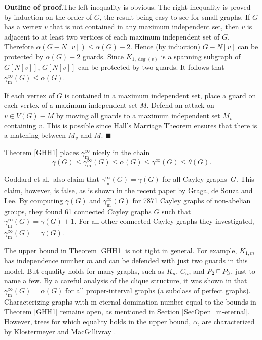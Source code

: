 \documentclass[12pt]{article}%
\providecommand{\boksie}{\ensuremath{\mathbin{\raisebox{0.3mm}{$\scriptstyle\square$}}}}
\begin{document}
\noindent\textbf{Outline of proof}.\hspace{0.1in}The left inequality is
obvious. The right inequality is proved by induction on the order of $G$, the
result being easy to see for small graphs. If $G$ has a vertex $v$ that is not
contained in any maximum independent set, then $v$ is adjacent to at least two
vertices of each maximum independent set of $G$. Therefore $\alpha
(G-N[v])\leq\alpha(G)-2$. Hence (by induction) $G-N[v]$ can be protected by
$\alpha(G)-2$ guards. Since $K_{1,\deg(v)}$ is a spanning subgraph of
$G[N[v]]$, $G[N[v]]$ can be protected by two guards. It follows that
$\gamma_{\mathrm{m}}^{\infty}(G)\leq\alpha(G)$.

If each vertex of $G$ is contained in a maximum independent set, place a guard
on each vertex of a maximum independent set $M$. Defend an attack on $v\in
V(G)-M$ by moving all guards to a maximum independent set $M_{v}$ containing
$v$. This is possible since Hall's Marriage Theorem ensures that there is a
matching between $M_{v}$ and $M$. \hfill$\blacksquare$

\bigskip

Theorem \ref{GHH1} places $\gamma_{\mathrm{m}}^{\infty}$ nicely in the chain
\[
\gamma(G)\leq\gamma_{\mathrm{m}}^{\infty}(G)\leq\alpha(G)\leq\gamma^{\infty
}(G)\leq\theta(G).
\]


Goddard et al.~also claim that $\gamma_{\mathrm{m}}^{\infty}(G)=\gamma(G)$ for
all Cayley graphs~$G$. This claim, however, is false, as is shown in the
recent paper \cite{BSL} by Graga, de Souza and Lee. By computing $\gamma(G)$
and $\gamma_{\mathrm{m}}^{\infty}(G)$ for 7871 Cayley graphs of non-abelian
groups, they found 61 connected Cayley graphs $G$ such that $\gamma
_{\mathrm{m}}^{\infty}(G)=\gamma(G)+1$. For all other connected Cayley graphs
they investigated, $\gamma_{\mathrm{m}}^{\infty}(G)=\gamma(G)$.

The upper bound in Theorem \ref{GHH1} is not tight in general. For example,
$K_{1,m}$ has independence number $m$ and can be defended with just two guards
in this model. But equality holds for many graphs, such as $K_{n}$, $C_{n}$,
and $P_{2}\boksie P_{3}$, just to name a few. By a careful analysis of the
clique structure, it was shown in \cite{Braga2} that $\gamma_{\mathrm{m}%
}^{\infty}(G)=\alpha(G)$ for all proper-interval graphs (a subclass of perfect
graphs). Characterizing graphs with m-eternal domination number equal to the
bounds in Theorem \ref{GHH1} remains open, as mentioned in Section
\ref{SecOpen_m-eternal}. However, trees for which equality holds in the upper
bound, $\alpha$, are characterized by Klostermeyer and MacGillivray
\cite{KM-trees}.
\end{document}
